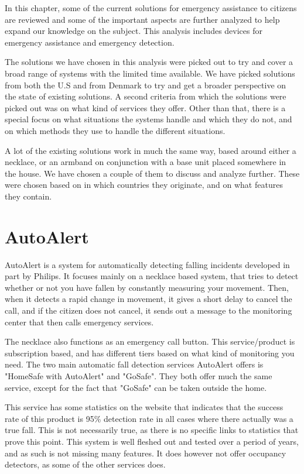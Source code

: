\label{sec:existing_solutions}
In this chapter, some of the current solutions for emergency assistance to citizens are reviewed and some of the important aspects are further analyzed to help expand our knowledge on the subject. This analysis includes devices for emergency assistance and emergency detection.

The solutions we have chosen in this analysis were picked out to try and cover a broad range of systems with the limited time available. We have picked solutions from both the U.S and from Denmark to try and get a broader perspective on the state of existing solutions.
A second criteria from which the solutions were picked out was on what kind of services they offer.
Other than that, there is a special focus on what situations the systems handle and which they do not, and on which methods they use to handle the different situations.

A lot of the existing solutions work in much the same way, based around either a necklace, or an armband on conjunction with a base unit placed somewhere in the house. We have chosen a couple of them to discuss and analyze further. These were chosen based on in which countries they originate, and on what features they contain. 


\section{AutoAlert}
\label{sec:lifeLine} 
AutoAlert \cite{AAlert} is a system for automatically detecting falling incidents developed in part by Philips. It focuses mainly on a necklace based system, that tries to detect whether or not you have fallen by constantly measuring your movement. Then, when it detects a rapid change in movement, it gives a short delay to cancel the call, and if the citizen does not cancel, it sends out a message to the monitoring center that then calls emergency services.

The necklace also functions as an emergency call button.
This service/product is subscription based, and has different tiers based on what kind of monitoring you need. The two main automatic fall detection services AutoAlert offers is "HomeSafe with AutoAlert" and "GoSafe". They both offer much the same service, except for the fact that "GoSafe" can be taken outside the home. 

This service has some statistics on the website that indicates that the success rate of this product is 95\% \cite{AAlert:homesafe}  detection rate in all cases where there actually was a true fall. This is not necessarily true, as there is no specific links to statistics that prove this point.
This system is well fleshed out and tested over a period of years, and as such is not missing many features. It does however not offer occupancy detectors, as some of the other services does.

